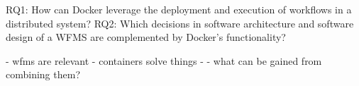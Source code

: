 
RQ1: How can Docker leverage the deployment and execution of workflows in a distributed system?
RQ2: Which decisions in software architecture and software design of a WFMS are complemented by Docker's functionality?


  - wfms are relevant
  - containers solve things
  -
  - what can be gained from combining them?



